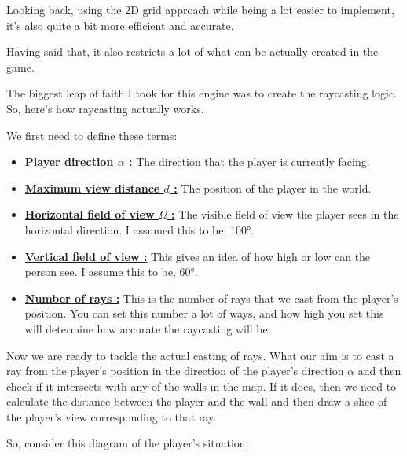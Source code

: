 Looking back, using the 2D grid approach while being a lot easier to implement, it's also quite a bit more efficient and accurate.

Having said that, it also restricts a lot of what can be actually created in the game.


The biggest leap of faith I took for this engine was to create the raycasting logic. So, here's how raycasting actually works.

We first need to define these terms:

\begin{itemize}

    \item \underline{\textbf{Player direction $\alpha$ :}} The direction that the player is currently facing.
		\item \underline{\textbf{Maximum view distance $d$ :}} The position of the player in the world.
    \item \underline{\textbf{Horizontal field of view $\Omega$ :}} The visible field of view the player sees in the horizontal direction. I assumed this to be, 100°.
    \item \underline{\textbf{Vertical field of view :}} This gives an idea of how high or low can the person see. I assume this to be, 60°.
    \item \underline{\textbf{Number of rays :}} This is the number of rays that we cast from the player's position. You can set this number a lot of ways, and how high you set this will determine how accurate the raycasting will be.

\end{itemize}

\pagebreak

Now we are ready to tackle the actual casting of rays. What our aim is to cast a ray from the player's position in the direction of the player's direction $\alpha$ and then check if it intersects with any of the walls in the map. If it does, then we need to calculate the distance between the player and the wall and then draw a slice of the player's view corresponding to that ray.

So, consider this diagram of the player's situation:

